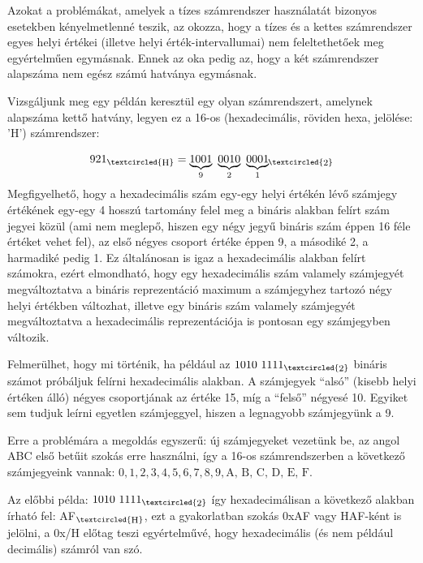 Azokat a problémákat, amelyek a tízes számrendszer használatát bizonyos esetekben kényelmetlenné teszik, az okozza, hogy a tízes és a kettes számrendszer egyes helyi értékei (illetve helyi érték-intervallumai) nem feleltethetőek meg egyértelműen egymásnak. Ennek az oka pedig az, hogy a két számrendszer alapszáma nem egész számú hatványa egymásnak.

Vizsgáljunk meg egy példán keresztül egy olyan számrendszert, amelynek alapszáma kettő hatvány, legyen ez a 16-os (hexadecimális, röviden hexa, jelölése: 'H') számrendszer:

$$921_{\textcircled{\raisebox{-0.9pt}{\footnotesize{H}}}} = \underbrace{1001}_\text{9}\ \underbrace{0010}_\text{2}\ \underbrace{0001}_\text{1} \hspace*{-2mm}\ _{\textcircled{\raisebox{-0.9pt}{\footnotesize{2}}}}$$
Megfigyelhető, hogy a hexadecimális szám egy-egy helyi értékén lévő számjegy értékének egy-egy 4 hosszú tartomány felel meg a bináris alakban felírt szám jegyei közül (ami nem meglepő, hiszen egy négy jegyű bináris szám éppen 16 féle értéket vehet fel), az első négyes csoport értéke éppen 9, a másodiké 2, a harmadiké pedig 1. Ez általánosan is igaz a hexadecimális alakban felírt számokra, ezért elmondható, hogy egy hexadecimális szám valamely számjegyét megváltoztatva a bináris reprezentáció maximum a számjegyhez tartozó négy helyi értékben változhat, illetve egy bináris szám valamely számjegyét megváltoztatva a hexadecimális reprezentációja is pontosan egy számjegyben változik.

Felmerülhet, hogy mi történik, ha például az $1010\ 1111_{\textcircled{\raisebox{-0.9pt}{\footnotesize{2}}}}$ bináris számot próbáljuk felírni hexadecimális alakban. A számjegyek ``alsó'' (kisebb helyi értéken álló) négyes csoportjának az értéke 15, míg a ``felső'' négyesé 10. Egyiket sem tudjuk leírni egyetlen számjeggyel, hiszen a legnagyobb számjegyünk a 9.

Erre a problémára a megoldás egyszerű: új számjegyeket vezetünk be, az angol ABC első betűit szokás erre használni, így a 16-os számrendszerben a következő számjegyeink vannak: $0, 1, 2, 3, 4, 5, 6, 7, 8, 9, \text{A, B, C, D, E, F}$. 

Az előbbi példa: $1010\ 1111_{\textcircled{\raisebox{-0.9pt}{\footnotesize{2}}}}$ így hexadecimálisan a következő alakban írható fel: AF$_{\textcircled{\raisebox{-0.9pt}{\footnotesize{H}}}}$, ezt a gyakorlatban szokás 0xAF vagy HAF-ként is jelölni, a 0x/H előtag teszi egyértelművé, hogy hexadecimális (és nem például decimális) számról van szó.

